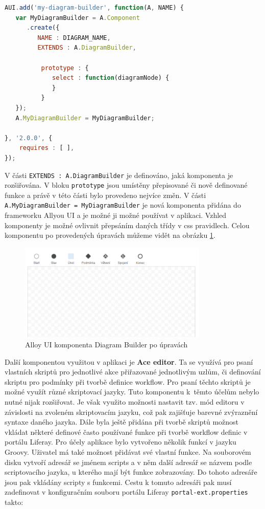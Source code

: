 \documentclass{fithesis}
\begin{document}
\begin{lstlisting}[language=JavaScript, caption = Rozšíření komponenty Diagram Builder , label = code:diagram_builder]
AUI.add('my-diagram-builder', function(A, NAME) {
   var MyDiagramBuilder = A.Component
      .create({
         NAME : DIAGRAM_NAME,
         EXTENDS : A.DiagramBuilder,

          prototype : {
             select : function(diagramNode) {
             }
          }
   });
   A.MyDiagramBuilder = MyDiagramBuilder;

}, '2.0.0', {
	requires : [ ],
});

\end{lstlisting}

V části \verb|EXTENDS : A.DiagramBuilder| je definováno, jaká komponenta je rozšiřována. V bloku \verb|prototype| jsou umístěny přepisované či nově definované funkce a právě v této části bylo provedeno nejvíce změn. V části \verb|A.MyDiagramBuilder = MyDiagramBuilder| je nová komponenta přidána do frameworku Allyou UI a je možné ji možné používat v aplikaci. Vzhled komponenty je možné ovlivnit přepsáním daných třídy v css pravidlech. Celou komponentu po  provedených úpravách můžeme vidět na obrázku  \ref{fig:diagram_builder_uprav}.

\begin{figure}[htp]
\centering
\includegraphics[width=340px]{images/diagram_builder_uprav.png}
\caption{Alloy UI komponenta Diagram Builder po úpravách}
\label{fig:diagram_builder_uprav}
\end{figure}

Další komponentou využitou v aplikaci je \textbf{Ace editor}. Ta se využívá pro psaní vlastních skriptů pro jednotlivé akce přiřazované jednotlivým uzlům, či definování skriptu pro podmínky při tvorbě definice workflow. Pro psaní těchto skriptů je možné využít různé skriptovací jazyky. Tuto komponentu k~těmto účelům nebylo nutné nijak rozšiřovat. Je však využito možnosti nastavit tzv. mód editoru v závislosti na zvoleném skriptovacím jazyku, což pak zajišťuje barevné zvýraznění syntaxe daného jazyka. Dále byla ještě přidána při tvorbě skriptů možnost vkládat některé definové často používané funkce při tvorbě workflow definic v portálu Liferay. Pro účely aplikace bylo vytvořeno několik funkcí v jazyku Groovy. Uživatel má také možnost přidávat své vlastní funkce. Na souborovém disku vytvoří adresář se jménem scripts a v něm další adresář se názvem podle scriptovacího jazyka, u kterého mají být funkce zobrazovány. Do tohoto adresáře jsou pak vkládány scripty s funkcemi. Cestu k tomuto adresáři pak musí zadefinovat v konfiguračním souboru portálu Liferay \verb|portal-ext.properties| takto:
\end{document}
